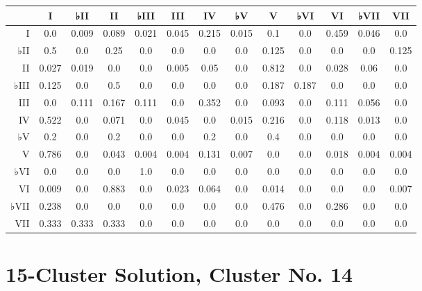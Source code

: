 \begin{table}[htbp]
\begin{minipage}{\linewidth}
\setlength{\tymax}{0.5\linewidth}
\centering
\small
\begin{tabulary}{\textwidth}{@{}RCCCCCCCCCCCC@{}} \toprule
&I&♭II&II&♭III&III&IV&♭V&V&♭VI&VI&♭VII&VII\\
\midrule
I&0.0&0.009&0.089&0.021&0.045&0.215&0.015&0.1&0.0&0.459&0.046&0.0\\
♭II&0.5&0.0&0.25&0.0&0.0&0.0&0.0&0.125&0.0&0.0&0.0&0.125\\
II&0.027&0.019&0.0&0.0&0.005&0.05&0.0&0.812&0.0&0.028&0.06&0.0\\
♭III&0.125&0.0&0.5&0.0&0.0&0.0&0.0&0.187&0.187&0.0&0.0&0.0\\
III&0.0&0.111&0.167&0.111&0.0&0.352&0.0&0.093&0.0&0.111&0.056&0.0\\
IV&0.522&0.0&0.071&0.0&0.045&0.0&0.015&0.216&0.0&0.118&0.013&0.0\\
♭V&0.2&0.0&0.2&0.0&0.0&0.2&0.0&0.4&0.0&0.0&0.0&0.0\\
V&0.786&0.0&0.043&0.004&0.004&0.131&0.007&0.0&0.0&0.018&0.004&0.004\\
♭VI&0.0&0.0&0.0&1.0&0.0&0.0&0.0&0.0&0.0&0.0&0.0&0.0\\
VI&0.009&0.0&0.883&0.0&0.023&0.064&0.0&0.014&0.0&0.0&0.0&0.007\\
♭VII&0.238&0.0&0.0&0.0&0.0&0.0&0.0&0.476&0.0&0.286&0.0&0.0\\
VII&0.333&0.333&0.333&0.0&0.0&0.0&0.0&0.0&0.0&0.0&0.0&0.0\\

\bottomrule

\end{tabulary}
\end{minipage}
\end{table}

\section{15-Cluster Solution, Cluster No. 14}
\label{15-clustersolutionclusterno.14}

